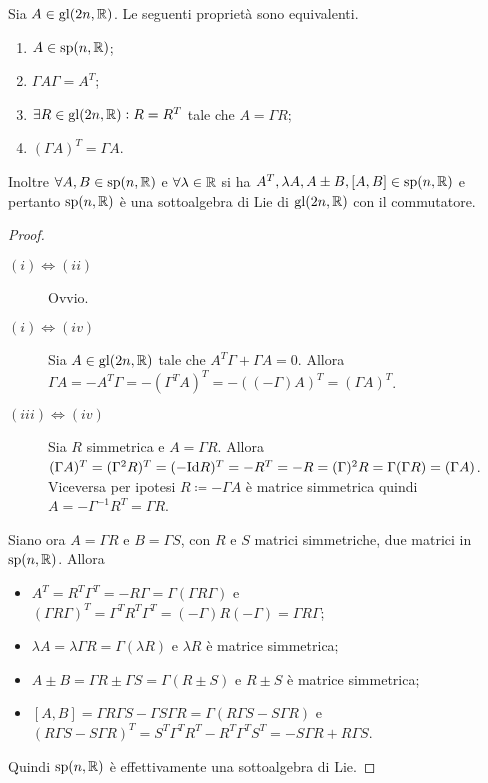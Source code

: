 \begin{thm} \label{thm:mat-sp}
    Sia $ A \in \mathrm{gl}(2n, \mathbb{R}) $. Le seguenti proprietà sono equivalenti.
    \begin{enumerate}[label=(\roman*)]
        \item $ A \in \mathrm{sp}(n, \mathbb{R}) $;
        \item $ \Gamma A \Gamma = A^T $;
        \item $ \exists R \in \mathrm{gl}(2n, \mathbb{R}) : R = R^T $ tale che $ A = \Gamma R $;
        \item\label{pt:GAsimm} $ (\Gamma A)^T = \Gamma A $.
    \end{enumerate}
    Inoltre $ \forall A, B \in \mathrm{sp}(n, \mathbb{R}) $ e $ \forall \lambda \in \mathbb{R} $ si ha $ A^T, \lambda A, A \pm B, [A, B] \in \mathrm{sp}(n, \mathbb{R}) $ e pertanto $ \mathrm{sp}(n, \mathbb{R}) $ è una sottoalgebra di Lie di $ \mathrm{gl}(2n, \mathbb{R}) $ con il commutatore.
\end{thm}
\begin{proof}
    \begin{description}
        \item[$ (i) \iff (ii) $] Ovvio.
        \item[$ (i) \iff (iv) $] Sia $ A \in \mathrm{gl}(2n, \mathbb{R}) $ tale che $ A^T \Gamma + \Gamma A = 0 $. Allora $ \Gamma A = - A^T \Gamma = - (\Gamma^T A)^T = - ((-\Gamma) A)^T = (\Gamma A)^T $.
        \item[$ (iii) \iff (iv) $] Sia $ R $ simmetrica e $ A = \Gamma R $. Allora $ (\Gamma A)^T = (\Gamma^2 R)^T = (-\mathrm{Id} R)^T = -R^T = -R = (\Gamma)^2 R = \Gamma (\Gamma R) = (\Gamma A) $. Viceversa per ipotesi $ R \coloneqq -\Gamma A $ è matrice simmetrica quindi $ A = - \Gamma^{-1} R^T = \Gamma R $.
    \end{description}
    \noindent Siano ora $ A = \Gamma R $ e $ B = \Gamma S $, con $ R $ e $ S $ matrici simmetriche, due matrici in $ \mathrm{sp}(n, \mathbb{R}) $. Allora
    \begin{itemize}
        \item $ A^T = R^T \Gamma^T = - R \Gamma = \Gamma (\Gamma R \Gamma) $ e $ (\Gamma R \Gamma)^T = \Gamma^T R^T \Gamma^T = (-\Gamma) R (-\Gamma) = \Gamma R \Gamma $;
        \item $ \lambda A = \lambda \Gamma R = \Gamma (\lambda R) $ e $ \lambda R $ è matrice simmetrica;
        \item $ A \pm B = \Gamma R \pm \Gamma S = \Gamma (R \pm S) $ e $ R \pm S $ è matrice simmetrica;
        \item $ [A, B] = \Gamma R \Gamma S - \Gamma S \Gamma R = \Gamma (R \Gamma S - S \Gamma R) $ e $ (R \Gamma S - S \Gamma R)^T = S^T \Gamma^T R^T - R^T \Gamma^T S^T = - S \Gamma R + R \Gamma S $.
    \end{itemize}
    Quindi $ \mathrm{sp}(n, \mathbb{R}) $ è effettivamente una sottoalgebra di Lie.
\end{proof}

